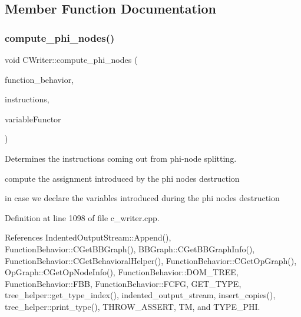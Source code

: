 \subsection{Member Function Documentation}
\mbox{\label{classCWriter_a5d4cb518818feb0e8ef025fa7b93b123}} 
\subsubsection{\texorpdfstring{compute\+\_\+phi\+\_\+nodes()}{compute\_phi\_nodes()}}
{\footnotesize\ttfamily void C\+Writer\+::compute\+\_\+phi\+\_\+nodes (\begin{DoxyParamCaption}\item[{const \hyperlink{function__behavior_8hpp_a94872da12ed056b6ecf90456164e0213}{Function\+Behavior\+Const\+Ref}}]{function\+\_\+behavior,  }\item[{const \hyperlink{classOpVertexSet}{Op\+Vertex\+Set} \&}]{instructions,  }\item[{\hyperlink{var__pp__functor_8hpp_a8a6b51b6519401d911398943510557f0}{var\+\_\+pp\+\_\+functor\+Const\+Ref}}]{variable\+Functor }\end{DoxyParamCaption})\hspace{0.3cm}{\ttfamily [protected]}}



Determines the instructions coming out from phi-\/node splitting. 

compute the assignment introduced by the phi nodes destruction

in case we declare the variables introduced during the phi nodes destruction 

Definition at line 1098 of file c\+\_\+writer.\+cpp.



References Indented\+Output\+Stream\+::\+Append(), Function\+Behavior\+::\+C\+Get\+B\+B\+Graph(), B\+B\+Graph\+::\+C\+Get\+B\+B\+Graph\+Info(), Function\+Behavior\+::\+C\+Get\+Behavioral\+Helper(), Function\+Behavior\+::\+C\+Get\+Op\+Graph(), Op\+Graph\+::\+C\+Get\+Op\+Node\+Info(), Function\+Behavior\+::\+D\+O\+M\+\_\+\+T\+R\+EE, Function\+Behavior\+::\+F\+BB, Function\+Behavior\+::\+F\+C\+FG, G\+E\+T\+\_\+\+T\+Y\+PE, tree\+\_\+helper\+::get\+\_\+type\+\_\+index(), indented\+\_\+output\+\_\+stream, insert\+\_\+copies(), tree\+\_\+helper\+::print\+\_\+type(), T\+H\+R\+O\+W\+\_\+\+A\+S\+S\+E\+RT, TM, and T\+Y\+P\+E\+\_\+\+P\+HI.




